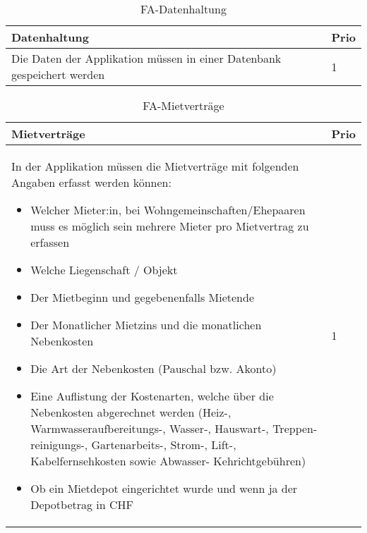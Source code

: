 \begin{table}[H]
  \centering
  \settowidth{}
  \setlength\extrarowheight{2pt}
  \begin{tabulary}{1.0\textwidth}{|m{16cm}|L|}
    \hline
    \textbf{Datenhaltung}&\textbf{Prio}\\
    \hline
      Die Daten der Applikation müssen in einer Datenbank gespeichert werden & 1\\
    \hline
  \end{tabulary}
  \caption{FA-Datenhaltung}
  \label{faDatenhaltung}
\end{table}

\begin{table}[H]
  \centering
  \settowidth{}
  \setlength\extrarowheight{2pt}
  \begin{tabulary}{1.0\textwidth}{|m{16cm}|L|}
    \hline
    \textbf{Mietverträge}&\textbf{Prio}\\
    \hline
    In der Applikation müssen die Mietverträge mit folgenden Angaben erfasst werden können:
    \begin{itemize}
      \item Welcher Mieter:in, bei Wohngemeinschaften/Ehepaaren muss es möglich sein mehrere Mieter pro Mietvertrag zu erfassen
      \item Welche Liegenschaft / Objekt
      \item Der Mietbeginn und gegebenenfalls Mietende
      \item Der Monatlicher Mietzins und die monatlichen Nebenkosten
      \item Die Art der Nebenkosten (Pauschal bzw. Akonto)
      \item Eine Auflistung der Kostenarten, welche über die Nebenkosten abgerechnet werden (Heiz-, Warmwasseraufbereitungs-, Wasser-, Hauswart-, Treppen-reinigungs-, Gartenarbeits-, Strom-, Lift-, Kabelfernsehkosten sowie Abwasser- Kehrichtgebühren)
      \item Ob ein Mietdepot eingerichtet wurde und wenn ja der Depotbetrag in CHF
    \end{itemize}  & 1\\ 
    \hline
  \end{tabulary}
  \caption{FA-Mietverträge}
  \label{faMietverträge}
\end{table}

